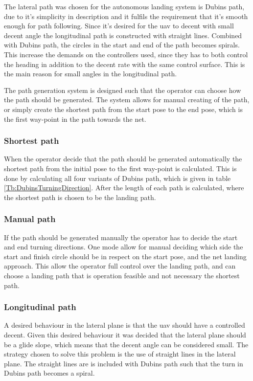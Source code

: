 The lateral path was chosen for the autonomous landing system is Dubins path, due to it's simplicity in description and it fulfils the requirement that it's smooth enough for path following. Since it's desired for the \gls{uav} to decent with small decent angle the longitudinal path is constructed with straight lines. Combined with Dubins path, the circles in the start and end of the path becomes spirals. This increase the demands on the controllers used, since they has to both control the heading in addition to the decent rate with the same control surface. This is the main reason for small angles in the longitudinal path.

The path generation system is designed such that the operator can choose how the path should be generated. The system allows for manual creating of the path, or simply create the shortest path from the start pose to the end pose, which is the first way-point in the path towards the net.
\subsubsection{Shortest path}
When the operator decide that the path should be generated automatically the shortest path from the initial pose to the first way-point is calculated. This is done by calculating all four variants of Dubins path, which is given in table \ref{Tb:DubinsTurningDirection}. After the length of each path is calculated, where the shortest path is chosen to be the landing path.
\subsubsection{Manual path}
If the path should be generated manually the operator has to decide the start and end turning directions.
One mode allow for manual deciding which side the start and finish circle should be in respect on the start pose, and the net landing approach. This allow the operator full control over the landing path, and can choose a landing path that is operation feasible and not necessary the shortest path.
\subsubsection{Longitudinal path}
A desired behaviour in the lateral plane is that the \gls{uav} should have a controlled decent. Given this desired behaviour it was decided that the lateral plane should be a glide slope, which means that the decent angle can be considered small. The strategy chosen to solve this problem is the use of straight lines in the lateral plane. The straight lines are is included with Dubins path such that the turn in Dubins path becomes a spiral.

